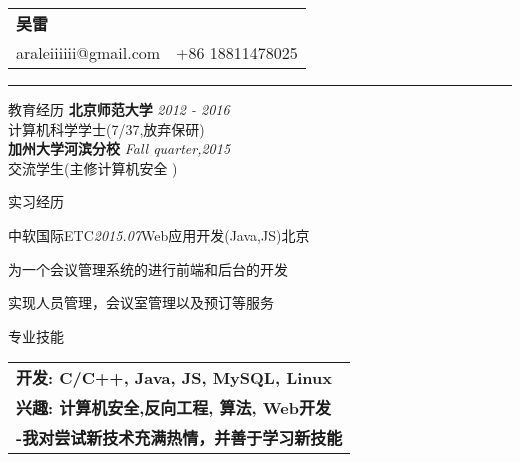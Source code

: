 \documentclass[UTF8]{resume} %
\begin{document}
\setlength{\parindent}{0pt}
\newcommand{\mywebheader}{
	\begin{tabular*}{7in}{l@{\extracolsep{\fill}}r}
		\textbf{{\LARGE 吴雷}} & {}\\
		{araleiiiiii@gmail.com} & {+86 18811478025} \\
	\end{tabular*}
	\noindent\rule{\textwidth}{2pt}
	\vspace{0.01in}}

\mywebheader



\setlength{\parindent}{0pt}

\begin{rSection}{教育经历}
{\bf 北京师范大学} \hfill {\em 2012 - 2016}\\
计算机科学学士(7/37,放弃保研) \\
{\bf 加州大学河滨分校} \hfill {\em Fall quarter,2015}\\
交流学生(主修计算机安全	)
\end{rSection}


\begin{rSection}{实习经历}

\begin{rSubsection}{中软国际ETC}{ {\em 2015.07}}{Web应用开发(Java,JS)}{北京}
\item 为一个会议管理系统的进行前端和后台的开发
\item 实现人员管理，会议室管理以及预订等服务 
\end{rSubsection}


\end{rSection}


\begin{rSection}{专业技能}

\begin{tabular}{ @{} >{\bfseries}l }
开发: { \rm C/C++, Java, JS, MySQL, Linux} \\
兴趣: { \rm 计算机安全,反向工程, 算法, Web开发}\\
 { \rm -我对尝试新技术充满热情，并善于学习新技能}
\end{tabular}

\end{rSection}
\end{document}
